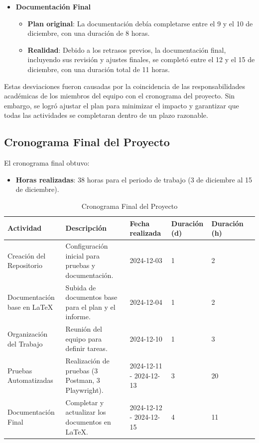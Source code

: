 \documentclass[stu, 12pt, letterpaper, donotrepeattitle, floatsintext, natbib]{apa7}
\begin{document}
\begin{itemize}
    \item \textbf{Documentación Final}  
    \begin{itemize}
        \item \textbf{Plan original}: La documentación debía completarse entre el 9 y el 10 de diciembre, con una duración de 8 horas.
        \item \textbf{Realidad}: Debido a los retrasos previos, la documentación final, incluyendo sus revisión y ajustes finales, se completó entre el 12 y el 15 de diciembre, con una duración total de 11 horas.
    \end{itemize}
\end{itemize}

Estas desviaciones fueron causadas por la coincidencia de las responsabilidades académicas de los miembros del equipo con el cronograma del proyecto. Sin embargo, se logró ajustar el plan para minimizar el impacto y garantizar que todas las actividades se completaran dentro de un plazo razonable.

\subsection*{Cronograma Final del Proyecto}
El cronograma final obtuvo:
\begin{itemize}
    \item \textbf{Horas realizadas}: 38 horas para el periodo de trabajo (3 de diciembre al 15 de diciembre).

\end{itemize}

\begin{table}[H]
    \centering
    \caption{Cronograma Final del Proyecto}
    \label{fig:cronograma}
    \begin{tabular}{|p{3cm}|p{4cm}|p{2cm}|p{2cm}|p{1.5cm}|p{1.5cm}|}
        \hline
        \textbf{Actividad} & \textbf{Descripción} & \textbf{Fecha realizada} & \textbf{Duración (d)} & \textbf{Duración (h)} \\ \hline
        Creación del Repositorio & Configuración inicial para pruebas y documentación. & 2024-12-03 & 1 & 2 \\ \hline
        Documentación base en LaTeX & Subida de documentos base para el plan y el informe. & 2024-12-04 & 1 & 2 \\ \hline
        Organización del Trabajo & Reunión del equipo para definir tareas. & 2024-12-10 & 1 & 3 \\ \hline
        Pruebas Automatizadas & Realización de pruebas (3 Postman, 3 Playwright). & 2024-12-11 - 2024-12-13 & 3 & 20 \\ \hline
        Documentación Final & Completar y actualizar los documentos en LaTeX. & 2024-12-12 - 2024-12-15 & 4 & 11 \\ \hline
    \end{tabular}
\end{table}
\end{document}
